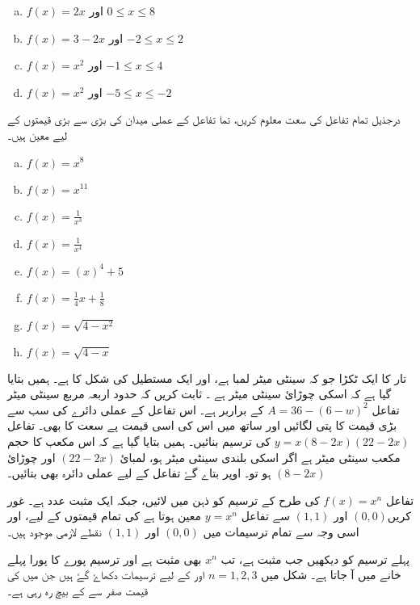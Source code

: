 \begin{multicols}{2}
\begin{enumerate}[a.]
 \item \( f(x)=2x  \) اور \( 0\le x\le 8 \)
\item \( f(x)=3-2x \) اور \( -2\le x\le 2 \)
\item \(f(x)=x^{2}  \) اور \( -1\le x\le 4 \)
\item \(  f(x)=x^{2} \) اور \(-5\le x\le -2 \)
\end{enumerate}
\end{multicols}
درجذیل تمام تفاعل کی سعت معلوم کریں، تما تفاعل  کے عملی میدان کی بڑی سے بڑی قیمتوں کے لیے معین ہیں۔
\begin{multicols}{4}
\begin{enumerate}[a.]
\item \( f(x)=x^{8} \)
\item \( f(x)=x^{11} \)
\item \(f(x)=\frac{1}{x^{3}}  \)
\item \( f(x)=\frac{1}{x^{4}} \)
\item \(f(x)=(x)^{4}+5  \)
\item \( f(x)=\frac{1}{4}x+\frac{1}{8} \)
\item \( f(x)=\sqrt{4-x^{2}} \)
\item \( f(x)=\sqrt{4-x} \)
\end{enumerate}
\end{multicols}
تار کا ایک ٹکڑا جو کہ  سینٹی میٹر لمبا ہے، اور ایک مستطیل کی شکل کا ہے۔ ہمیں بتایا گیا ہے کہ اسکی چوڑائ  سینٹی میٹر ہے ۔ ثابت کریں کہ حدود اربعہ  مربع سینٹی میٹر تفاعل \(A=36-(6-w)^{2}\) کے براربر ہے۔ اس تفاعل کے عملی دائرے کی سب سے بڑی قیمت کا پتی لگائیں اور ساتھ میں اس کی اسی قیمت پے سعت کا بھی۔
تفاعل \(y=x(8-2x)(22-2x)\) کی ترسیم بنائیں۔ ہمیں بتایا گیا ہے کہ اس مکعب کا حجم  مکعب سینٹی میٹر ہے اگر اسکی بلندی  سینٹی میٹر ہو، لمبائ \((22-2x)\) اور چوڑائ \((8-2x)\) ہو تو۔ اوپر بتاے گۓ تفاعل کے لیے عملی دائرہ بھی بتائیں۔

 تفاعل \(f(x)=x^{n}\) کی طرح کے ترسیم کو ذہن میں لائیں، جبکہ  ایک مثبت عدد ہے۔ غور کریں\(  (0,0)  \) اور  \((1,1)\) سے تفاعل \(y=x^{n}\) معین ہوتا ہے  کی تمام قیمتوں کے لیے، اور اسی وجہ سے تمام ترسیمات میں \(  (0,0)  \) اور  \((1,1)\) نقطے لازمی موجود ہیں۔

پہلے ترسیم کو دیکھیں جب  مثبت ہے، تب \(x^{n}\) بھی مثبت ہے اور ترسیم پورے کا پورا پہلے خانے میں آ جاتا ہے۔ شکل  میں \(  n=1,2,3 \) اور  کے لیے ترسیمات دکھاۓ گۓ ہیں جن میں  کی قیمت صفر سے  کے بیچ رہ رہی ہے۔

